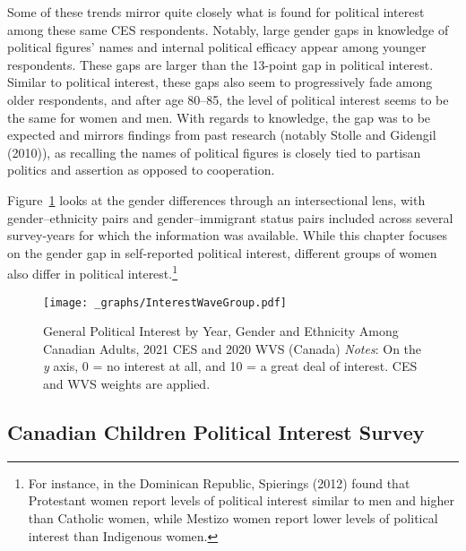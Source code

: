 \documentclass[
  letterpaper,
  DIV=11,
  numbers=noendperiod]{scrreprt}
\begin{document}
Some of these trends mirror quite closely what is found for political
interest among these same CES respondents. Notably, large gender gaps in
knowledge of political figures' names and internal political efficacy
appear among younger respondents. These gaps are larger than the
13-point gap in political interest. Similar to political interest, these
gaps also seem to progressively fade among older respondents, and after
age 80--85, the level of political interest seems to be the same for
women and men. With regards to knowledge, the gap was to be expected and
mirrors findings from past research (notably Stolle and Gidengil
(2010)), as recalling the names of political figures is closely tied to
partisan politics and assertion as opposed to cooperation.

Figure~\ref{fig-yearethnicityceswvs} looks at the gender differences
through an intersectional lens, with gender--ethnicity pairs and
gender--immigrant status pairs included across several survey-years for
which the information was available. While this chapter focuses on the
gender gap in self-reported political interest, different groups of
women also differ in political interest.\footnote{For instance, in the
  Dominican Republic, Spierings (2012) found that Protestant women
  report levels of political interest similar to men and higher than
  Catholic women, while Mestizo women report lower levels of political
  interest than Indigenous women.}

\begin{figure}

{\centering \texttt{[image: \_graphs/InterestWaveGroup.pdf]}

}

\caption{\label{fig-yearethnicityceswvs}General Political Interest by
Year, Gender and Ethnicity Among Canadian Adults, 2021 CES and 2020 WVS
(Canada) \newline \textit{Notes}: On the \textit{y} axis, 0 = no
interest at all, and 10 = a great deal of interest. CES and WVS weights
are applied.}

\end{figure}

\hypertarget{canadian-children-political-interest-survey}{%
\subsection{Canadian Children Political Interest
Survey}\label{canadian-children-political-interest-survey}}
\end{document}
